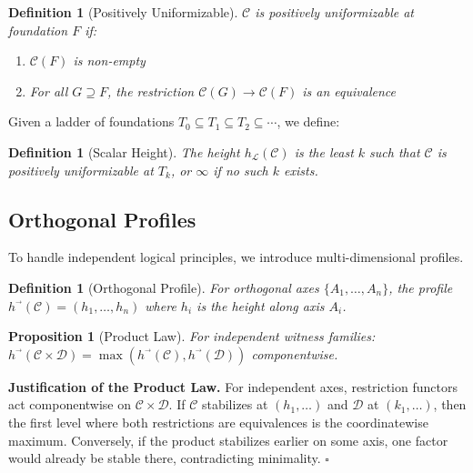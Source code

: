 \documentclass[11pt]{article}
\newtheorem{definition}[theorem]{Definition}
\newtheorem{proposition}[theorem]{Proposition}
\newenvironment{proof}[1][Proof]{\noindent\textbf{#1.}\hspace{0.5em}}{\hfill$\square$\par}
\begin{document}
\begin{definition}[Positively Uniformizable]
$\mathcal{C}$ is \emph{positively uniformizable} at foundation $F$ if:
\begin{enumerate}
\item $\mathcal{C}(F)$ is non-empty
\item For all $G \supseteq F$, the restriction $\mathcal{C}(G) \to \mathcal{C}(F)$ is an equivalence
\end{enumerate}
\end{definition}

Given a ladder of foundations $T_0 \subseteq T_1 \subseteq T_2 \subseteq \cdots$, we define:

\begin{definition}[Scalar Height]
The \emph{height} $h_{\mathcal{L}}(\mathcal{C})$ is the least $k$ such that $\mathcal{C}$ is positively uniformizable at $T_k$, or $\infty$ if no such $k$ exists.
\end{definition}

\subsection{Orthogonal Profiles}

To handle independent logical principles, we introduce multi-dimensional profiles.

\begin{definition}[Orthogonal Profile]
For orthogonal axes $\{A_1, \ldots, A_n\}$, the \emph{profile} $h^{\vec{}}(\mathcal{C}) = (h_1, \ldots, h_n)$ where $h_i$ is the height along axis $A_i$.
\end{definition}

\begin{proposition}[Product Law]
For independent witness families: $h^{\vec{}}(\mathcal{C} \times \mathcal{D}) = \max(h^{\vec{}}(\mathcal{C}), h^{\vec{}}(\mathcal{D}))$ componentwise.
\end{proposition}

\begin{proof}[Justification of the Product Law]
For independent axes, restriction functors act componentwise on $\mathcal{C}\times\mathcal{D}$.
If $\mathcal{C}$ stabilizes at $(h_1,\dots)$ and $\mathcal{D}$ at $(k_1,\dots)$, then the first level
where both restrictions are equivalences is the coordinatewise maximum. Conversely, if the product
stabilizes earlier on some axis, one factor would already be stable there, contradicting minimality.
\end{proof}
\end{document}
